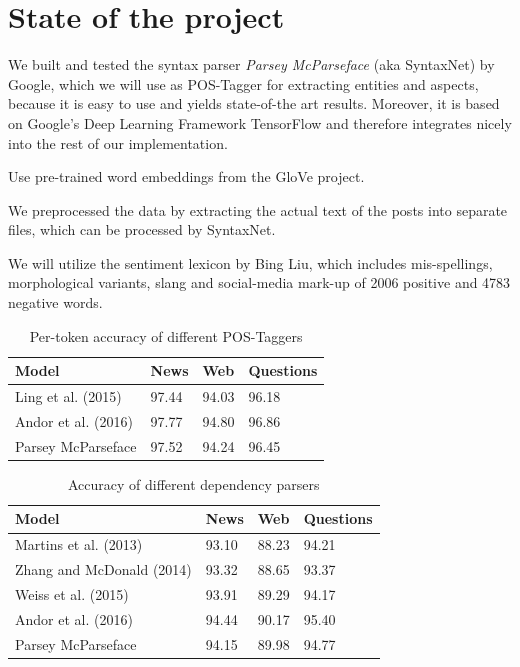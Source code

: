 \documentclass[10pt,a4paper]{article}
\begin{document}
	\section{State of the project}
	We built and tested the syntax parser \textit{Parsey McParseface} (aka SyntaxNet) by Google, which we will use as POS-Tagger for extracting entities and aspects, because it is easy to use and yields state-of-the art results. Moreover, it is based on Google's Deep Learning Framework TensorFlow and therefore integrates nicely into the rest of our implementation.
	
	Use pre-trained word embeddings from the GloVe project.
	
	We preprocessed the data by extracting the actual text of the posts into separate files, which can be processed by SyntaxNet.
	
	We will utilize the sentiment lexicon by Bing Liu, which includes mis-spellings, morphological variants, slang and social-media mark-up of 2006 positive and 4783 negative words.
	
	\begin{table}[h]
		\centering
		\caption{Per-token accuracy of different POS-Taggers}
		\label{tab:posaccuracy}
		\begin{tabular}{|l|l|l|l|}
			\hline
			Model & News & Web & Questions \\
			\hline
			Ling et al. (2015) & 97.44 & 94.03 & 96.18 \\
			\hline
			Andor et al. (2016) & 97.77 & 94.80 & 96.86 \\
			\hline
			Parsey McParseface & 97.52 & 94.24 & 96.45 \\
			\hline
		\end{tabular}
	\end{table}
	
	\begin{table}[h]
		\centering
		\caption{Accuracy of different dependency parsers}
		\label{tab:parseraccuracy}
		\begin{tabular}{|l|l|l|l|}
			\hline
			Model & News & Web & Questions \\
			\hline
			Martins et al. (2013) & 93.10 & 88.23 & 94.21 \\
			\hline
			Zhang and McDonald (2014) & 93.32 & 88.65 & 93.37 \\
			\hline
			Weiss et al. (2015) & 93.91 & 89.29 & 94.17 \\
			\hline
			Andor et al. (2016) & 94.44 & 90.17 & 95.40 \\
			\hline
			Parsey McParseface & 94.15 & 89.98 & 94.77 \\
			\hline
		\end{tabular}
	\end{table}
\end{document}
